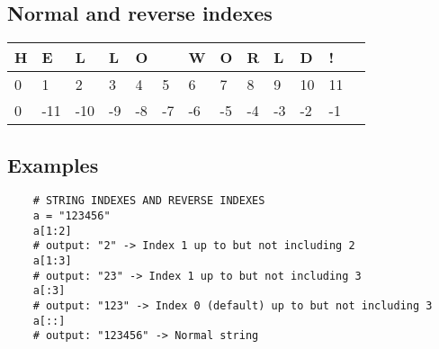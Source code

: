 \subsection{Normal and reverse indexes}
\begin{center}
    \begin{tabular}{ |l|l|l|l|l|l|l|l|l|l|l|l|l| }
        \hline
            H & E & L & L & O &   & W & O & R & L & D & ! \\
            \hline
            0 & 1 & 2 & 3 & 4 & 5 & 6 & 7 & 8 & 9 & 10 & 11 \\ 
            \hline
            0 & -11 & -10 & -9 & -8 & -7 & -6 & -5 & -4 & -3 & -2 & -1 \\ 
        \hline
    \end{tabular}
\end{center}
\subsection{Examples}
\begin{verbatim}
    # STRING INDEXES AND REVERSE INDEXES
    a = "123456"
    a[1:2] 
    # output: "2" -> Index 1 up to but not including 2
    a[1:3]  
    # output: "23" -> Index 1 up to but not including 3
    a[:3]   
    # output: "123" -> Index 0 (default) up to but not including 3
    a[::]   
    # output: "123456" -> Normal string 
\end{verbatim}


